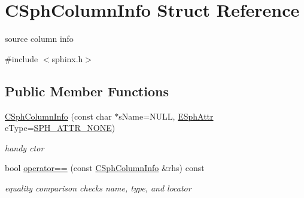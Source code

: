 \hypertarget{structCSphColumnInfo}{\section{C\-Sph\-Column\-Info Struct Reference}
\label{structCSphColumnInfo}
}


source column info  




{\ttfamily \#include $<$sphinx.\-h$>$}

\subsection*{Public Member Functions}
\begin{DoxyCompactItemize}
\item 
\hyperlink{structCSphColumnInfo_ab7fb288c06e900895763e215667e81fc}{C\-Sph\-Column\-Info} (const char $\ast$s\-Name=N\-U\-L\-L, \hyperlink{sphinxexpr_8h_aa883df0db2e4468a107fdd2d2ae625a3}{E\-Sph\-Attr} e\-Type=\hyperlink{sphinxexpr_8h_aa883df0db2e4468a107fdd2d2ae625a3ab7fa01b194212d4ffe0f3d8cb9c55c81}{S\-P\-H\-\_\-\-A\-T\-T\-R\-\_\-\-N\-O\-N\-E})
\begin{DoxyCompactList}\small\item\em handy ctor \end{DoxyCompactList}\item 
bool \hyperlink{structCSphColumnInfo_ad2976a895824c450726abd8369454689}{operator==} (const \hyperlink{structCSphColumnInfo}{C\-Sph\-Column\-Info} \&rhs) const 
\begin{DoxyCompactList}\small\item\em equality comparison checks name, type, and locator \end{DoxyCompactList}\end{DoxyCompactItemize}
